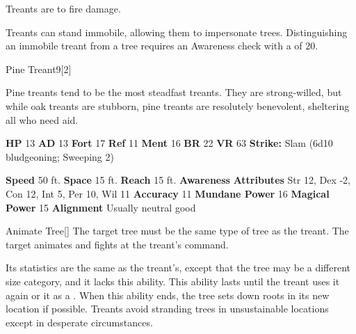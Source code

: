         Treants are  to fire damage.
      
        Treants can stand immobile, allowing them to impersonate trees.
        Distinguishing an immobile treant from a tree requires an Awareness check with a  of 20.
  

  \begin{monsubsection}{Pine Treant}{9}[2]
    \vspace{-1em}\vspace{-1em}
    \vspace{0em}

    
           Pine treants tend to be the most steadfast treants.
           They are strong-willed, but while oak treants are stubborn, pine treants are resolutely benevolent, sheltering all who need aid.
        

    \begin{spellcontent}
      \begin{spelltargetinginfo}
        \pari \textbf{HP} 13 \monsep
          \textbf{AD} 13 \monsep
          \textbf{Fort} 17 \monsep
          \textbf{Ref} 11 \monsep
          \textbf{Ment} 16
        \pari \textbf{BR} 22 \monsep
        \textbf{VR} 63
        \pari \textbf{Strike:}
            Slam  (6d10 bludgeoning; Sweeping 2)
      \end{spelltargetinginfo}
    \end{spellcontent}
    \begin{monsterfooter}
      \pari \textbf{Speed} 50 ft. \monsep
        \textbf{Space} 15 ft. \monsep
        \textbf{Reach} 15 ft.
      \pari \textbf{Awareness} 
      \pari \textbf{Attributes}
        Str 12, Dex -2,
        Con 12, Int 5,
        Per 10, Wil 11
      \pari \textbf{Accuracy} 11 \monsep
        \textbf{Mundane Power} 16 \monsep
      \textbf{Magical Power} 15
      \pari \textbf{Alignment} Usually neutral good
    \end{monsterfooter}
  \end{monsubsection}
  \begin{freeability}{Animate Tree}[]
      The target tree must be the same type of tree as the treant.
        The target animates and fights at the treant's command.

        Its statistics are the same as the treant's, except that the tree may be a different size category, and it lacks this ability.
        This ability lasts until the treant uses it again or  it as a .
        When this ability ends, the tree sets down roots in its new location if possible.
        Treants avoid stranding trees in unsustainable locations except in desperate circumstances.
    \end{freeability}
  
